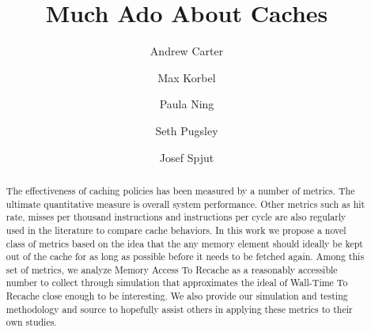 \documentclass[conference]{IEEEtran}
\begin{document}
\title{Much Ado About Caches}


\author{Andrew Carter \and Max Korbel \and Paula Ning \and Seth Pugsley \and Josef Spjut}

\maketitle

\begin{abstract}
The effectiveness of caching policies has been measured by a number of metrics. 
The ultimate quantitative measure is overall system performance.
Other metrics such as hit rate, misses per thousand instructions and
instructions per cycle are also regularly used in the literature to
compare cache behaviors.
In this work we propose a novel class of metrics based on the idea
that the any memory element should ideally be kept out of the cache
for as long as possible before it needs to be fetched again.
Among this set of metrics, we analyze Memory Access To Recache as a
reasonably accessible number to collect through simulation that
approximates the ideal of Wall-Time To Recache close enough to be
interesting.
We also provide our simulation and testing methodology and source to
hopefully assist others in applying these metrics to their own
studies.
\end{abstract}











\end{document}
